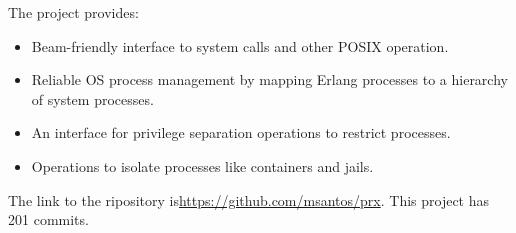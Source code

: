 The project provides:

\begin{itemize}
	\item Beam-friendly interface to system calls and other POSIX operation.
	\item Reliable OS process management by mapping Erlang processes to a hierarchy of system processes.
	\item An interface for privilege separation operations to restrict processes.
	\item Operations to isolate processes like containers and jails.
\end{itemize}


The link to the ripository is\url{https://github.com/msantos/prx}. This project has 201 commits. 




